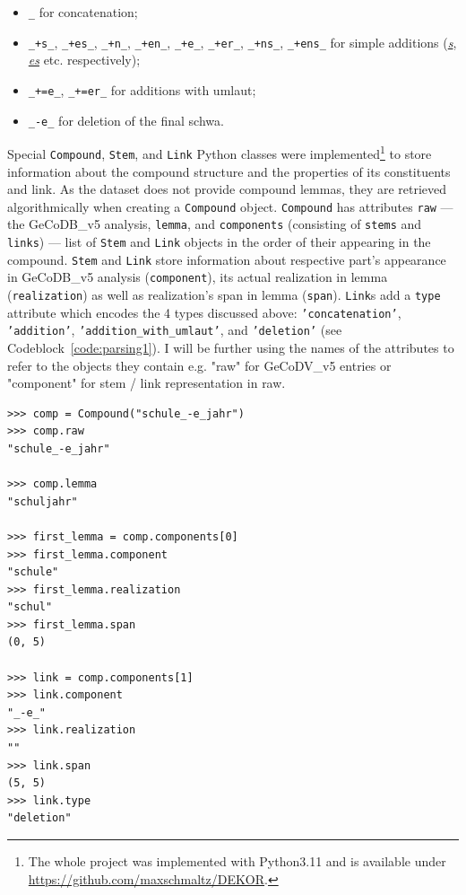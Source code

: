 \documentclass[11pt]{article}
\begin{document}
\begin{itemize}

    \item \texttt{\_} for concatenation;
    
    \item \texttt{\_+s\_}, \texttt{\_+es\_}, \texttt{\_+n\_}, \texttt{\_+en\_}, \texttt{\_+e\_}, \texttt{\_+er\_}, \texttt{\_+ns\_}, \texttt{\_+ens\_} for simple additions (\textit{\underline{s}}, \textit{\underline{es}} etc. respectively);
    
    \item \texttt{\_+=e\_}, \texttt{\_+=er\_} for additions with umlaut;
    
    \item \texttt{\_-e\_} for deletion of the final schwa.

\end{itemize}

Special \texttt{Compound}, \texttt{Stem}, and \texttt{Link} Python classes were implemented\footnote{The whole project was implemented with Python3.11 and is available under \url{https://github.com/maxschmaltz/DEKOR}.} to store information about the compound structure and the properties of its constituents and link. As the dataset does not provide compound lemmas, they are retrieved algorithmically when creating a \texttt{Compound} object. \texttt{Compound} has attributes \texttt{raw} --- the GeCoDB\_v5 analysis, \texttt{lemma}, and \texttt{components} (consisting of \texttt{stems} and \texttt{links}) --- list of \texttt{Stem} and \texttt{Link} objects in the order of their appearing in the compound. \texttt{Stem} and \texttt{Link} store information about respective part's appearance in GeCoDB\_v5 analysis (\texttt{component}), its actual realization in lemma (\texttt{realization}) as well as realization's span in lemma (\texttt{span}). \texttt{Link}s add a \texttt{type} attribute which encodes the 4 types discussed above: \texttt{'concatenation'}, \texttt{'addition'}, \texttt{'addition\_with\_umlaut'}, and \texttt{'deletion'} (see Codeblock~\ref{code:parsing1}). I will be further using the names of the attributes to refer to the objects they contain e.g. "raw" for GeCoDV\_v5 entries or "component" for stem / link representation in raw.

\begin{minipage}{\linewidth}
\begin{lstlisting}[frame=single, caption={Example of parsing of GeCoDB\_v5 entry \texttt{"schule\_-e\_jahr"}}, label={code:parsing1}, captionpos=b]
>>> comp = Compound("schule_-e_jahr")
>>> comp.raw
"schule_-e_jahr"

>>> comp.lemma
"schuljahr"

>>> first_lemma = comp.components[0]
>>> first_lemma.component
"schule"
>>> first_lemma.realization
"schul"
>>> first_lemma.span
(0, 5)

>>> link = comp.components[1]
>>> link.component
"_-e_"
>>> link.realization
""
>>> link.span
(5, 5)
>>> link.type
"deletion"
\end{lstlisting}
\end{minipage}
\end{document}
